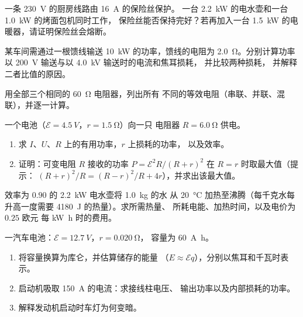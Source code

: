\begin{exercise}[$\star\star$]\label{exo:g11:circuits-and-power:10}
一条 \qty{230}{V} 的厨房线路由 \qty{16}{A} 的保险丝保护。
一台 \qty{2.2}{kW} 的电水壶和一台 \qty{1.0}{kW} 的烤面包机同时工作，
保险丝能否保持完好？若再加入一台 \qty{1.5}{kW} 的电暖器，请证明保险丝会熔断。
\end{exercise}

\begin{exercise}[$\star\star$]\label{exo:g11:circuits-and-power:11}
某车间需通过一根馈线输送 \qty{10}{kW} 的功率，馈线的电阻为
\qty{2.0}{\ohm}。分别计算功率以 \qty{200}{V} 输送与以 \qty{4.0}{kV} 输送时的电流和焦耳损耗，
并比较两种损耗，
并解释二者比值的原因。
\end{exercise}

\begin{exercise}[$\star\star\star$]\label{exo:g11:circuits-and-power:12}
用全部三个相同的 \qty{60}{\ohm} 电阻器，列出所有
不同的等效电阻（串联、并联、混联），并逐一计算。
\end{exercise}

\begin{exercise}[$\star\star\star$]\label{exo:g11:circuits-and-power:13}
一个电池（$\mathcal{E} = \qty{4.5}{V}$，$r = \qty{1.5}{\ohm}$）向一只
电阻器 $R = \qty{6.0}{\ohm}$ 供电。
\begin{enumerate}
  \item 求 $I$、$U$、$R$ 上的有用功率，$r$ 上损耗的功率，
        以及效率。
  \item 证明：可变电阻 $R$ 接收的功率
        $P = \mathcal{E}^2 R/(R+r)^2$ 在 $R = r$ 时取最大值（提示：
        $(R+r)^2/R = (R-r)^2/R + 4r$），并求出该最大值。
\end{enumerate}
\end{exercise}

\begin{exercise}[$\star\star\star$]\label{exo:g11:circuits-and-power:14}
效率为 $0.90$ 的 \qty{2.2}{kW} 电水壶将 \qty{1.0}{kg} 的水
从 \qty{20}{\degreeCelsius} 加热至沸腾（每千克水每升高一度需要
\qty{4180}{J} 的热量）。求所需热量、
所耗电能、加热时间，以及电价为 $0.25$ 欧元
每 \unit{kW.h} 时的费用。
\end{exercise}

\begin{exercise}[$\star\star\star$]\label{exo:g11:circuits-and-power:15}
一汽车电池：$\mathcal{E} = \qty{12.7}{V}$，$r = \qty{0.020}{\ohm}$，
容量为 \qty{60}{A.h}。
\begin{enumerate}
  \item 将容量换算为库仑，并估算储存的能量
        （$E \approx \mathcal{E} q$），分别以焦耳和千瓦时表示。
  \item 启动机吸取 \qty{150}{A} 的电流：求接线柱电压、
        输出功率以及内部损耗的功率。
  \item 解释发动机启动时车灯为何变暗。
\end{enumerate}
\end{exercise}

